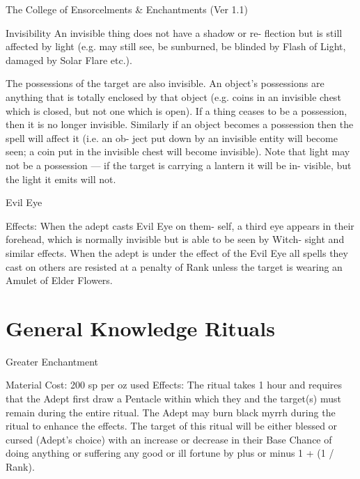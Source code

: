 \begin{Chapter}{The College of Ensorcelments \& Enchantments (Ver 1.1)}
\begin{spell}[G-8]{Invisibility }
An  invisible  thing  does  not  have  a  shadow  or  re-
flection  but  is  still  affected  by  light  (e.g.  may  still 
see,  be  sunburned,  be  blinded  by  Flash  of  Light, 
damaged by Solar Flare etc.).  

The possessions of the target are also invisible. An 
object’s  possessions  are  anything  that  is  totally 
enclosed  by  that  object  (e.g.  coins  in  an  invisible 
chest  which  is  closed, but not  one  which  is  open). 
If  a  thing  ceases  to  be  a  possession,  then  it  is  no 
longer  invisible.  Similarly  if  an  object  becomes  a 
possession  then  the  spell  will  affect  it  (i.e.  an  ob-
ject  put  down  by  an  invisible  entity  will  become 
seen; a coin put in the invisible chest will become 
invisible). Note that light may not be a possession 
—  if  the  target  is  carrying  a  lantern  it  will  be  in-
visible, but the light it emits will not. 

\end{spell}

\begin{spell}[G-9]{Evil Eye }

Effects:  When  the  adept  casts  Evil  Eye  on  them-
self, a third eye appears in their forehead, which is 
normally invisible but is able to be seen by Witch-
sight  and  similar  effects.  When  the  adept  is  under 
the  effect  of  the  Evil  Eye  all  spells  they  cast  on 
others  are  resisted  at  a  penalty  of  Rank  unless  the 
target is wearing an Amulet of Elder Flowers. 
\end{spell}


\section{General Knowledge Rituals}

\begin{ritual}[Q-1]{Greater Enchantment }

Material Cost: 200 sp per oz used 
Effects:  The  ritual  takes  1  hour  and  requires  that 
the  Adept  first  draw  a  Pentacle  within  which  they 
and  the  target(s)  must  remain  during  the  entire 
ritual. The Adept may burn black myrrh during the 
ritual  to  enhance  the  effects.  The  target  of  this 
ritual  will  be  either  blessed  or  cursed  (Adept’s 
choice)  with  an  increase  or  decrease  in  their  Base 
Chance of doing anything or suffering any good or 
ill fortune by plus or minus 1 + (1 / Rank). 


\end{ritual}
\end{Chapter}
